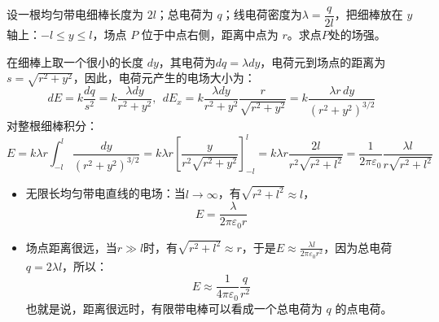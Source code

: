 \documentclass[lang=cn,11pt]{elegantbook}
\begin{document}
\begin{exercise}[均匀带电细棒中垂线上的电场]
  设一根均匀带电细棒长度为 \(2l\)；总电荷为 \(q\)；线电荷密度为\(\lambda=\dfrac{q}{2l}\)，把细棒放在 \(y\) 轴上：\(-l\leq y\leq l\)，场点 \(P\) 位于中点右侧，距离中点为 \(r\)。求点$P$处的场强。
\end{exercise}
\begin{solution}
在细棒上取一个很小的长度 \(dy\)，其电荷为\(dq=\lambda dy\)，电荷元到场点的距离为\(s=\sqrt{r^2+y^2}\)，因此，电荷元产生的电场大小为：
\[dE=k\frac{dq}{s^2}=k\frac{\lambda dy}{r^2+y^2},~~dE_x=k\frac{\lambda dy}{r^2+y^2}\frac{r}{\sqrt{r^2+y^2}}=k\frac{\lambda r\,dy}{(r^2+y^2)^{3/2}}\]
对整根细棒积分：
\[E=k\lambda r\int_{-l}^{l}\frac{dy}{(r^2+y^2)^{3/2}}=k\lambda r\left[
\frac{y}{r^2\sqrt{r^2+y^2}}\right]_{-l}^{l}=k\lambda r\frac{2l}{r^2\sqrt{r^2+l^2}}=
\frac{1}{2\pi\varepsilon_0}\frac{\lambda l}{r\sqrt{r^2+l^2}}\]
\begin{itemize}
\item 无限长均匀带电直线的电场：当\(l\rightarrow\infty\)，有\(\sqrt{r^2+l^2}\approx l\)，\[\boxed{E=\frac{\lambda}{2\pi\varepsilon_0r}}\]
\item 场点距离很远，当\(r\gg l\)时，有\(\sqrt{r^2+l^2}\approx r\)，于是\(E\approx
\frac{\lambda l}{2\pi\varepsilon_0r^2}\)，因为总电荷\(q=2\lambda l\)，所以：
\[
\boxed{
E\approx
\frac{1}{4\pi\varepsilon_0}
\frac{q}{r^2}
}
\]也就是说，距离很远时，有限带电棒可以看成一个总电荷为 \(q\) 的点电荷。
\end{itemize}
\end{solution}
\end{document}
